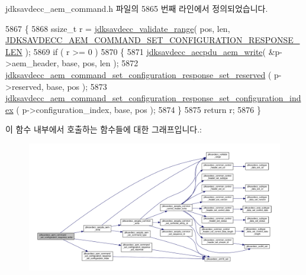 jdksavdecc\+\_\+aem\+\_\+command.\+h 파일의 5865 번째 라인에서 정의되었습니다.


\begin{DoxyCode}
5867 \{
5868     ssize\_t r = \hyperlink{group__util_ga9c02bdfe76c69163647c3196db7a73a1}{jdksavdecc\_validate\_range}( pos, len, 
      \hyperlink{group__command__set__configuration__response_gabfda3489bac29dd70f22df45614e6824}{JDKSAVDECC\_AEM\_COMMAND\_SET\_CONFIGURATION\_RESPONSE\_LEN} 
      );
5869     \textcolor{keywordflow}{if} ( r >= 0 )
5870     \{
5871         \hyperlink{group__aecpdu__aem_gad658e55771cce77cecf7aae91e1dcbc5}{jdksavdecc\_aecpdu\_aem\_write}( &p->aem\_header, base, pos, len );
5872         \hyperlink{group__command__set__configuration__response_gab99c434cfdbc9b1c987a75d1d3c5f8e0}{jdksavdecc\_aem\_command\_set\_configuration\_response\_set\_reserved}
      ( p->reserved, base, pos );
5873         
      \hyperlink{group__command__set__configuration__response_ga229514f45b3e6c01267f632b6558a137}{jdksavdecc\_aem\_command\_set\_configuration\_response\_set\_configuration\_index}
      ( p->configuration\_index, base, pos );
5874     \}
5875     \textcolor{keywordflow}{return} r;
5876 \}
\end{DoxyCode}


이 함수 내부에서 호출하는 함수들에 대한 그래프입니다.\+:
\nopagebreak
\begin{figure}[H]
\begin{center}
\leavevmode
\includegraphics[width=350pt]{group__command__set__configuration__response_ga37009742ab4bab11573c25104a94f67a_cgraph}
\end{center}
\end{figure}


